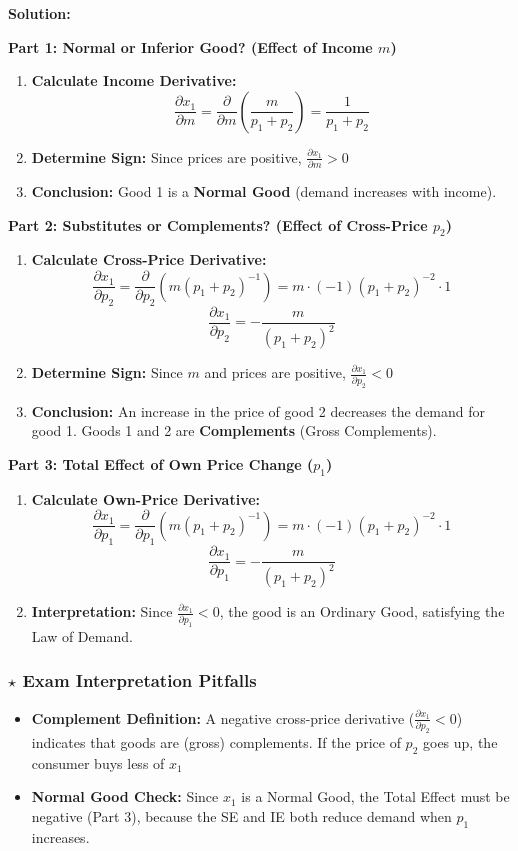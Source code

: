 \documentclass{article}
\begin{document}
\textbf{Solution:}

\textbf{Part 1: Normal or Inferior Good? (Effect of Income $m$)}
\begin{enumerate}
    \item \textbf{Calculate Income Derivative:}
    \[ \frac{\partial x_1}{\partial m} = \frac{\partial}{\partial m} \left( \frac{m}{p_1 + p_2} \right) = \frac{1}{p_1 + p_2} \]
    \item \textbf{Determine Sign:} Since prices are positive, $\frac{\partial x_1}{\partial m} > 0$
    \item \textbf{Conclusion:} Good 1 is a \textbf{Normal Good} (demand increases with income).
\end{enumerate}

\textbf{Part 2: Substitutes or Complements? (Effect of Cross-Price $p_2$)}
\begin{enumerate}
    \item \textbf{Calculate Cross-Price Derivative:}
    \[ \frac{\partial x_1}{\partial p_2} = \frac{\partial}{\partial p_2} \left( m (p_1 + p_2)^{-1} \right) = m \cdot (-1) (p_1 + p_2)^{-2} \cdot 1 \]
    \[ \frac{\partial x_1}{\partial p_2} = -\frac{m}{(p_1 + p_2)^2} \]
    \item \textbf{Determine Sign:} Since $m$ and prices are positive, $\frac{\partial x_1}{\partial p_2} < 0$
    \item \textbf{Conclusion:} An increase in the price of good 2 decreases the demand for good 1. Goods 1 and 2 are \textbf{Complements} (Gross Complements).
\end{enumerate}

\textbf{Part 3: Total Effect of Own Price Change ($p_1$)}
\begin{enumerate}
    \item \textbf{Calculate Own-Price Derivative:}
    \[ \frac{\partial x_1}{\partial p_1} = \frac{\partial}{\partial p_1} \left( m (p_1 + p_2)^{-1} \right) = m \cdot (-1) (p_1 + p_2)^{-2} \cdot 1 \]
    \[ \frac{\partial x_1}{\partial p_1} = -\frac{m}{(p_1 + p_2)^2} \]
    \item \textbf{Interpretation:} Since $\frac{\partial x_1}{\partial p_1} < 0$, the good is an Ordinary Good, satisfying the Law of Demand.
\end{enumerate}

\subsubsection*{$\star$ Exam Interpretation Pitfalls}
\begin{itemize}
    \item \textbf{Complement Definition:} A negative cross-price derivative ($\frac{\partial x_1}{\partial p_2} < 0$) indicates that goods are (gross) complements. If the price of $p_2$ goes up, the consumer buys less of $x_1$
    \item \textbf{Normal Good Check:} Since $x_1$ is a Normal Good, the Total Effect must be negative (Part 3), because the SE and IE both reduce demand when $p_1$ increases.
\end{itemize}
\end{document}
